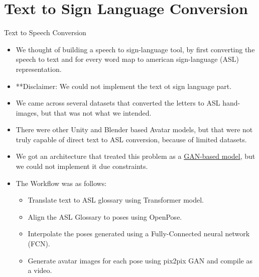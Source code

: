 \documentclass[10pt]{beamer}
\begin{document}
\section{Text to Sign Language Conversion}
\begin{frame}{Text to Speech Conversion}
\begin{itemize}
	\item We thought of building a speech to sign-language tool, by first converting the speech to text and for every word map to american sign-language (ASL) representation.
	\item \textcolor{red!60!white}{**Disclaimer:
{\small We could not implement the text ot sign language part.}}
	\item We came across several datasets that converted the letters to ASL hand-images, but that was not what we intended.
	\item There were other Unity and Blender based Avatar models, but that were not truly capable of direct text to ASL conversion, because of limited datasets.
	\item We got an architecture that treated this problem as a \href{https://github.com/arunnair411/Speech-to-ASL}{GAN-based model}, but we could not implement  it due constraints.
	\item The Workflow was as follows:
	\begin{itemize}
		\item Translate text to ASL glossary using Transformer model.
		\item Align the ASL Glossary to poses using OpenPose.
		\item Interpolate the poses generated using a Fully-Connected neural network (FCN).
		\item Generate avatar images for each pose using pix2pix GAN and compile as a video.
	\end{itemize}
\end{itemize}
\end{frame}
\end{document}
